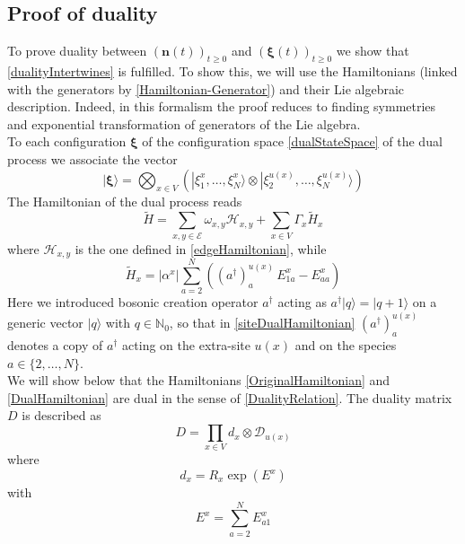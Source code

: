 \documentclass[11pt]{article}
\numberwithin{equation}{section}
\numberwithin{equation}{subsection}
\newcommand{\dd}{\mathcal{D}_{u(x)}}
\begin{document}
\subsection{Proof of duality}
To prove duality between $(\bm{n}(t))_{t\geq 0}$ and $(\bm{\xi}(t))_{t\geq 0}$ we  show that \eqref{dualityIntertwines} is fulfilled.  To show this, we will use the Hamiltonians (linked with the generators by \eqref{Hamiltonian-Generator}) and their Lie algebraic description. Indeed, in this formalism the proof reduces to finding symmetries and exponential transformation of generators of the Lie algebra.\\
To each configuration $\bm{\xi}$ of the configuration space  \eqref{dualStateSpace} of the dual process we associate the vector
\begin{equation}
    |\bm{\xi}\rangle=\bigotimes_{x\in V}\left(|\xi_{1}^{x},\ldots,\xi_{N}^{x}\rangle\otimes |\xi_{2}^{u(x)},\ldots,\xi_{N}^{u(x)}\rangle\right)
\end{equation}
The Hamiltonian of the dual process reads
\begin{equation}\label{DualHamiltonian}
    \widetilde{H}=\sum_{x,y\in \mathcal{E}}\omega_{x,y}\mathcal{H}_{x,y}+\sum_{x\in V}\Gamma_{x}\widetilde{H}_{x}
\end{equation}
where $\mathcal{H}_{x,y}$ is the one defined in \eqref{edgeHamiltonian}, while 
\begin{equation}\label{siteDualHamiltonian}
    \widetilde{H}_{x}=|\alpha^{x}|\sum_{a=2}^{N}\left((a^{\dagger})_{a}^{u(x)}\,E_{1a}^{x}-E_{aa}^{x}\right)
\end{equation}
Here we introduced bosonic creation operator $a^{\dagger}$ acting as $a^{\dagger}|q\rangle=|q+1\rangle$ on a generic vector $|q\rangle$ with $q\in \mathbb{N}_{0}$, so that in \eqref{siteDualHamiltonian} 
$(a^{\dagger})_{a}^{u(x)}$ denotes a copy of $a^{\dagger}$ acting on the extra-site $u(x)$ and on the species $a\in\{2,\ldots,N\}$. \\
We will show below that the Hamiltonians \eqref{OriginalHamiltonian} and \eqref{DualHamiltonian} are dual in the sense of \eqref{DualityRelation}. The duality matrix $D$ is described as 
\begin{equation}\label{dualityMatrix}
    D=\prod_{x\in V}d_{x}\otimes \dd
\end{equation}
where
\begin{equation}\label{bulkElementDualityMatrix}
d_{x}=R_{x}\exp{(E^{x})}
\end{equation}
with 
\begin{equation}\label{EquationEx}
E^{x}=\sum_{a=2}^{N}E_{a1}^{x}
\end{equation}
\end{document}
